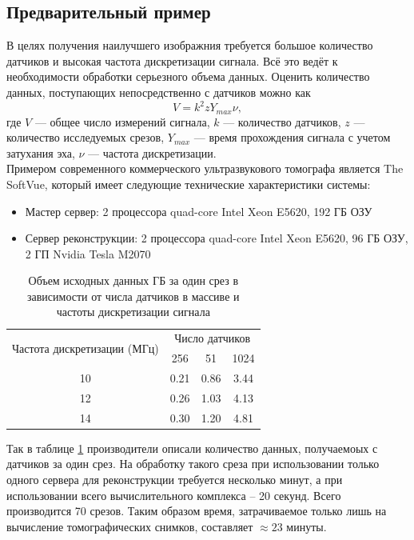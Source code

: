 \documentclass[14pt]{matmex-diploma}
\begin{document}
\subsection{Предварительный пример}
В целях получения наилучшего изображния требуется большое количество датчиков и высокая частота дискретизации сигнала. Всё это ведёт к необходимости обработки серьезного объема данных. Оценить количество данных, поступающих непосредственно с датчиков можно как
\[ V = k^2  z  Y_{max} \nu,   \]
где $V$ --- общее число измерений сигнала, $k$ --- количество датчиков, $z$ --- количество исследуемых срезов, $Y_{max}$ --- время прохождения сигнала с учетом затухания эха, $\nu$ --- частота дискретизации. \\
Примером современного коммерческого ультразвукового томографа является The SoftVue\cite{roy2013breast}, который имеет следующие технические характеристики системы:
\begin{itemize}
\item Мастер сервер: 2 процессора quad-core Intel Xeon E5620, 192 ГБ ОЗУ
\item Сервер реконструкции: 2 процессора quad-core Intel Xeon E5620, 96 ГБ ОЗУ, 2 ГП Nvidia Tesla M2070
\end{itemize}

\begin{table}[h]
\centering
\caption{Объем исходных данных ГБ за один срез в зависимости от числа датчиков в массиве и частоты дискретизации сигнала \cite{roy2013breast}}
\begin{tabular}{ c | c | c | c }
    \hline
    \multirow{2}{*}{Частота дискретизации (МГц)} & \multicolumn{3}{c}{Число датчиков}  \\ \cline{2-4}
    & 256 & 51 & 1024 \\
    
    \hline
    10 & 0.21 & 0.86 & 3.44 \\
    12 & 0.26 & 1.03 & 4.13 \\
    14 & 0.30 & 1.20 & 4.81 \\
    \hline
\end{tabular}

\label{table:datasize_ex}
\end{table}
Так в таблице \ref{table:datasize_ex} производители описали количество данных, получаемоых с датчиков за один срез. На обработку такого среза при использовании только одного сервера для реконструкции требуется несколько минут, а при использовании всего вычислительного комплекса -- 20 секунд. Всего производится 70 срезов\cite{roy2013breast}. Таким образом время, затрачиваемое только лишь на вычисление томографических снимков, составляет $\approx 23 $ минуты.
\end{document}

